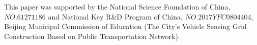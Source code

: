 \documentclass[journal]{IEEEtran}
\begin{document}
This paper was supported by the National Science Foundation of China, $NO.61271186$ and National Key R\&D Program of China, $NO.2017YFC0804404$, Beijing Municipal Commission of Education (The City's Vehicle Sensing Grid Construction Based on Public Transportation Network).


\ifCLASSOPTIONcaptionsoff
  \newpage
\fi




\end{document}

